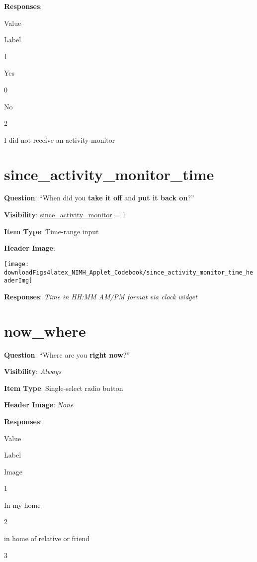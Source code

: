 \documentclass[]{book}
\begin{document}
\textbf{Responses}:

Value

Label

1

Yes

0

No

2

I did not receive an activity monitor

\hypertarget{since_activity_monitor_time}{%
\section{since\_activity\_monitor\_time}\label{since_activity_monitor_time}}

\textbf{Question}: ``When did you \textbf{take it off} and \textbf{put it back on}?''

\textbf{Visibility}: \protect\hyperlink{since_activity_monitor}{since\_activity\_monitor} = 1

\textbf{Item Type}: Time-range input

\textbf{Header Image}:

\begin{flushleft}\texttt{[image: downloadFigs4latex\_NIMH\_Applet\_Codebook/since\_activity\_monitor\_time\_headerImg]} \end{flushleft}

\textbf{Responses}: \emph{Time in HH:MM AM/PM format via clock widget}

\hypertarget{now_where}{%
\section{now\_where}\label{now_where}}

\textbf{Question}: ``Where are you \textbf{right now}?''

\textbf{Visibility}: \emph{Always}

\textbf{Item Type}: Single-select radio button

\textbf{Header Image}: \emph{None}

\textbf{Responses}:

Value

Label

Image

1

In my home

2

in home of relative or friend

3
\end{document}
